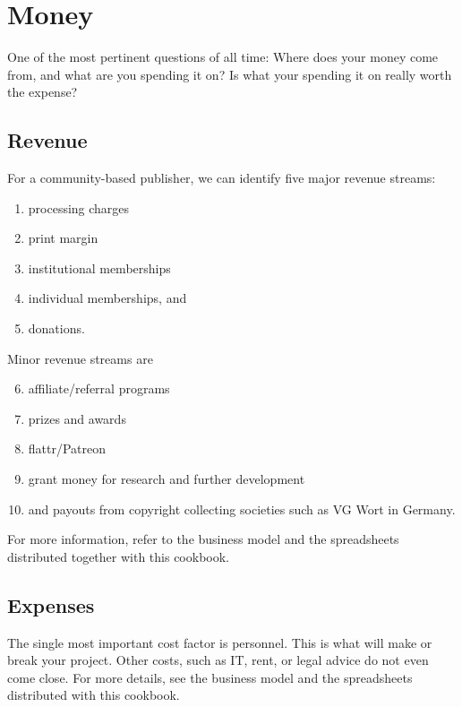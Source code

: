 \documentclass[nonflat,modfonts,output=book] {langsci/langscibook}
\begin{document}
\section{Money}\label{sec:money}
One of the most pertinent questions of all time: Where does your money come from, and what are you spending it on? Is what your spending it on really worth the expense? 
\subsection{Revenue}
For a community-based publisher, we can identify five major revenue streams: 
\begin{enumerate}
 \item processing charges
 \item print margin
 \item institutional memberships
 \item individual memberships, and  
 \item donations.
\end{enumerate}

\noindent 
Minor revenue streams are 
\begin{enumerate}
\setcounter{enumi}{5}
 \item affiliate/referral programs
 \item prizes and awards
 \item flattr/Patreon
 \item  grant money for research and further development
 \item and payouts from copyright collecting societies such as VG Wort in Germany. 
\end{enumerate}
 
For more information, refer to the business model and the spreadsheets distributed together with this cookbook. 

\subsection{Expenses}
The single most important cost factor is personnel.  This is what will make or break your project. Other costs, such as IT, rent, or legal advice do not even come close. For more details, see the business model and the spreadsheets distributed with this cookbook. 

\end{document}
